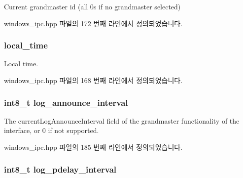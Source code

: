 Current grandmaster id (all 0\textquotesingle{}s if no grandmaster selected) 



windows\+\_\+ipc.\+hpp 파일의 172 번째 라인에서 정의되었습니다.

\subsubsection[{\texorpdfstring{local\+\_\+time}{local_time}}]{ local\+\_\+time}\hypertarget{class_offset_a77a3c33b68032d5db3c0c556a80ef651}{}\label{class_offset_a77a3c33b68032d5db3c0c556a80ef651}


Local time. 



windows\+\_\+ipc.\+hpp 파일의 168 번째 라인에서 정의되었습니다.

\subsubsection[{\texorpdfstring{log\+\_\+announce\+\_\+interval}{log_announce_interval}}]{\setlength{\rightskip}{0pt plus 5cm}int8\+\_\+t log\+\_\+announce\+\_\+interval}\hypertarget{class_offset_a15bb50a04ecd3ec11563012afc7e24a7}{}\label{class_offset_a15bb50a04ecd3ec11563012afc7e24a7}


The current\+Log\+Announce\+Interval field of the grandmaster functionality of the interface, or 0 if not supported. 



windows\+\_\+ipc.\+hpp 파일의 185 번째 라인에서 정의되었습니다.

\subsubsection[{\texorpdfstring{log\+\_\+pdelay\+\_\+interval}{log_pdelay_interval}}]{\setlength{\rightskip}{0pt plus 5cm}int8\+\_\+t log\+\_\+pdelay\+\_\+interval}\hypertarget{class_offset_a26544b553c0b251da8e632533f260a5d}{}\label{class_offset_a26544b553c0b251da8e632533f260a5d}


